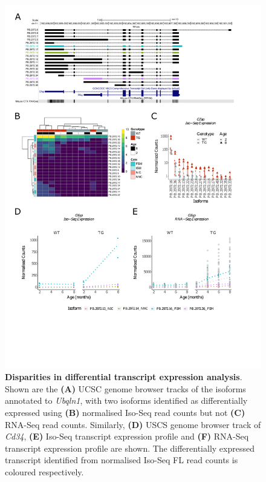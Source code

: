 \begin{figure}[!htp]
	\centering
	\includegraphics[page=3,trim={1.5cm 3cm 2cm 1cm}, scale = 0.80]{Figures/Ch5_DiffPlots.pdf}
	\captionsetup{width=0.95\textwidth}
	\caption[Disparities in differential transcript expression analysis]%
	{\textbf{Disparities in differential transcript expression analysis}. Shown are the \textbf{(A)} UCSC genome browser tracks of the isoforms annotated to \textit{Ubqln1}, with two isoforms identified as differentially expressed using \textbf{(B)} normalised Iso-Seq read counts but not \textbf{(C)} RNA-Seq read counts. Similarly, \textbf{(D)} USCS genome browser track of \textit{Cd34}, \textbf{(E)} Iso-Seq transcript expression profile and \textbf{(F)} RNA-Seq transcript expression profile are shown. The differentially expressed transcript identified from normalised Iso-Seq FL read counts is coloured respectively. 
	}   
	\label{fig:DEI_cd34_ubq}
\end{figure}

